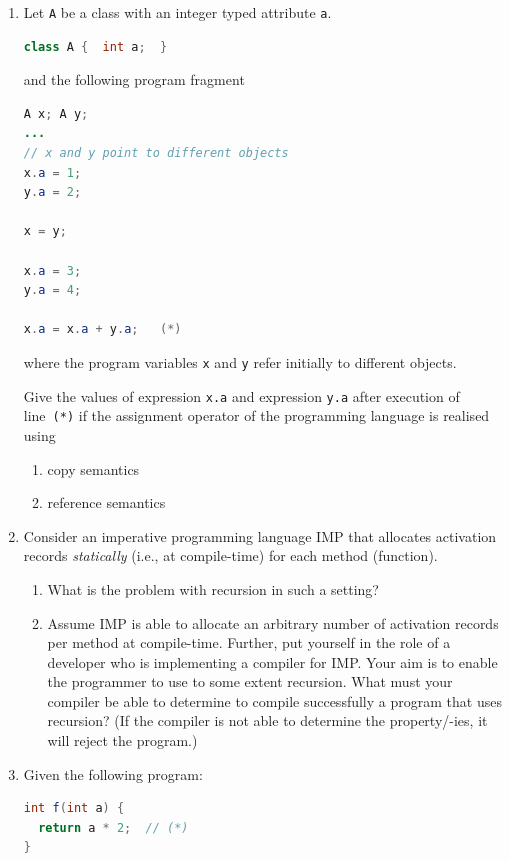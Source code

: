 \documentclass{article}
\begin{document}
\begin{enumerate}
\item Let \lstinline!A! be a class with an integer typed attribute
  \lstinline!a!.
\begin{lstlisting}[language=Java, columns=flexible]
class A {  int a;  }
\end{lstlisting}

and the following program fragment
\begin{lstlisting}[language=Java, columns=flexible] 
A x; A y;
...
// x and y point to different objects
x.a = 1;
y.a = 2;

x = y;

x.a = 3;
y.a = 4;
      
x.a = x.a + y.a;   (*)
\end{lstlisting}
where the program variables \lstinline!x! and \lstinline!y! refer
initially to different objects.

Give the values of expression \lstinline!x.a! and expression
\lstinline!y.a! after execution of line~\lstinline!(*)! if the
assignment operator of the programming language is realised using
\begin{enumerate}
  \item copy semantics 
  \item reference semantics 
\end{enumerate}
\item Consider an imperative programming language \textsf{IMP} that
  allocates activation records \emph{statically} (i.e., at
  compile-time) for each method (function).
  \begin{enumerate}
  \item What is the problem with recursion in such a setting?
  \item Assume \textsf{IMP} is able to allocate an arbitrary number of
    activation records per method at compile-time. Further, put
    yourself in the role of a developer who is implementing a compiler
    for \textsf{IMP}. Your aim is to enable the programmer to use to
    some extent recursion. What must your compiler be able to
    determine to compile successfully a program that uses recursion?
    (If the compiler is not able to determine the property/-ies, it
    will reject the program.)
 \end{enumerate}
\item Given the following program:
\begin{lstlisting}[language=Java, columns=flexible] 
int f(int a) {
  return a * 2;  // (*)
} 


\end{lstlisting}
\end{enumerate}
\end{document}
